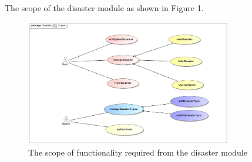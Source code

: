 The scope of the disaster module as shown in Figure 1.

\begin{figure}[ht!]
\centering
\includegraphics[width=90mm]{../images/Scope.jpg}
\caption{The scope of functionality required from the disaster module \label{overflow}}
\end{figure}